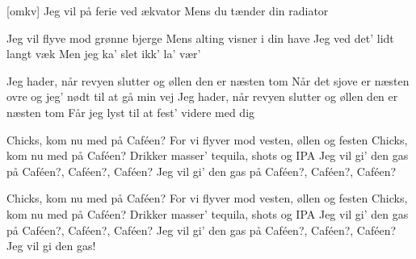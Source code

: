 \documentclass[a4paper,11pt]{article}
\begin{document}
\begin{song}
  [omkv] Jeg vil på ferie ved ækvator
Mens du tænder din radiator

Jeg vil flyve mod grønne bjerge
Mens alting visner i din have
Jeg ved det’ lidt langt væk
Men jeg ka' slet ikk' la' vær'

  Jeg hader, når revyen slutter
og øllen den er næsten tom
Når det sjove er næsten ovre
og jeg’ nødt til at gå min vej
Jeg hader, når revyen slutter
og øllen den er næsten tom
Får jeg lyst til at fest’ videre med dig

 Chicks, kom nu med på Caféen?
For vi flyver mod vesten, øllen og festen
Chicks, kom nu med på Caféen?
Drikker masser’ tequila, shots og IPA
Jeg vil gi’ den gas på Caféen?, Caféen?, Caféen?
Jeg vil gi’ den gas på Caféen?, Caféen?, Caféen?

Chicks, kom nu med på Caféen?
For vi flyver mod vesten, øllen og festen
Chicks, kom nu med på Caféen?
Drikker masser’ tequila, shots og IPA
Jeg vil gi’ den gas på Caféen?, Caféen?, Caféen?
Jeg vil gi’ den gas på Caféen?, Caféen?, Caféen?
Jeg vil gi den gas!


\end{song}
\end{document}
